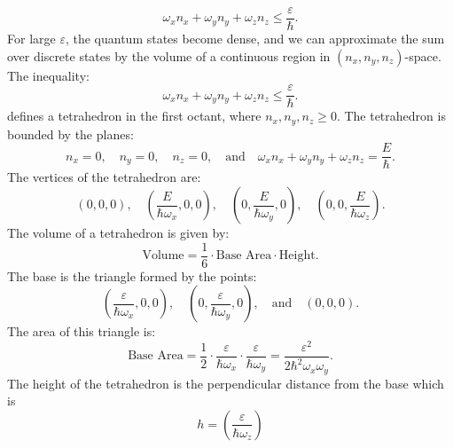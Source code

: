\documentclass{article}
\numberwithin{equation}{section}
\numberwithin{equation}{subsection}
\begin{document}
\[
\omega_{\mathit{x}} \mathit{n}_{\mathit{x}} + \omega_{\mathit{y}} \mathit{n}_{\mathit{y}} + \omega_{\mathit{z}} \mathit{n}_{\mathit{z}} \leq \frac{\varepsilon}{\hbar}.
\]
For large \(\varepsilon\), the quantum states become dense, and we can approximate the sum over discrete states by the volume of a continuous region in \((\mathit{n}_{\mathit{x}}, \mathit{n}_{\mathit{y}}, \mathit{n}_{\mathit{z}})\)-space. The inequality:
\[
\omega_{\mathit{x}} \mathit{n}_{\mathit{x}} + \omega_{\mathit{y}} \mathit{n}_{\mathit{y}} + \omega_{\mathit{z}} \mathit{n}_{\mathit{z}} \leq \frac{\varepsilon}{\hbar}.
\]
defines a tetrahedron in the first octant, where \(\mathit{n}_{\mathit{x}}, \mathit{n}_{\mathit{y}}, \mathit{n}_{\mathit{z}} \geq 0\).
The tetrahedron is bounded by the planes:
\[
\mathit{n}_{\mathit{x}} = 0, \quad \mathit{n}_{\mathit{y}} = 0, \quad \mathit{n}_{\mathit{z}} = 0, \quad \text{and} \quad \omega_{\mathit{x}} \mathit{n}_{\mathit{x}} + \omega_{\mathit{y}} \mathit{n}_{\mathit{y}} + \omega_{\mathit{z}} \mathit{n}_{\mathit{z}} = \frac{E}{\hbar}.
\]
The vertices of the tetrahedron are:
\[
(0, 0, 0), \quad \left( \frac{E}{\hbar \omega_{\mathit{x}}}, 0, 0 \right), \quad \left( 0, \frac{E}{\hbar \omega_{\mathit{y}}}, 0 \right), \quad \left( 0, 0, \frac{E }{\hbar \omega_{\mathit{z}}} \right).
\]
The volume of a tetrahedron is given by:
\[
\text{Volume} = \frac{1}{6} \cdot \text{Base Area} \cdot \text{Height}.
\]
The base is the triangle formed by the points:
\[
\left( \frac{\varepsilon }{\hbar \omega_{\mathit{x}}}, 0, 0 \right), \quad \left( 0, \frac{\varepsilon }{\hbar \omega_{\mathit{y}}}, 0 \right), \quad \text{and} \quad (0, 0, 0).
\]
The area of this triangle is:
\[
\text{Base Area} = \frac{1}{2} \cdot \frac{\varepsilon }{\hbar \omega_{\mathit{x}}} \cdot \frac{\varepsilon}{\hbar \omega_{\mathit{y}}} = \frac{\varepsilon^2}{2\hbar^2\omega_{\mathit{x}}\omega_{\mathit{y}}}.
\]
The height of the tetrahedron is the perpendicular distance from the base which is \[h = \left(\frac{\varepsilon}{\hbar\omega_{\mathit{z}}}\right)\]\\
\end{document}
